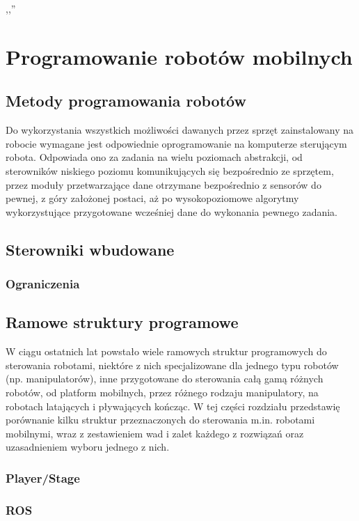 

\begin{savequote}[70mm]
,,''
\qauthor{}
\end{savequote}


\chapter{Programowanie robotów mobilnych}
\label{chap:programowanie}

\section{Metody programowania robotów}

Do wykorzystania wszystkich możliwości dawanych przez sprzęt zainstalowany na robocie
wymagane jest odpowiednie oprogramowanie na komputerze sterującym robota. Odpowiada
ono za zadania na wielu poziomach abstrakcji, od sterowników niskiego poziomu
komunikujących się bezpośrednio ze sprzętem, przez moduły przetwarzające dane otrzymane
bezpośrednio z sensorów do pewnej, z góry założonej postaci, aż po wysokopoziomowe
algorytmy wykorzystujące przygotowane wcześniej dane do wykonania pewnego zadania.

\section{Sterowniki wbudowane}

\subsection{Ograniczenia}

\section{Ramowe struktury programowe}


W ciągu ostatnich lat powstało wiele ramowych struktur programowych do sterowania
robotami, niektóre z nich specjalizowane dla jednego typu robotów (np. manipulatorów),
inne przygotowane do sterowania całą gamą różnych robotów, od platform mobilnych,
przez różnego rodzaju manipulatory, na robotach latających i pływających kończąc.
W tej części rozdziału przedstawię porównanie kilku struktur przeznaczonych do
sterowania m.in. robotami mobilnymi, wraz z zestawieniem wad i zalet każdego z rozwiązań
oraz uzasadnieniem wyboru jednego z nich.


\subsection{Player/Stage}

\cite{gerkey03playerstage}

\subsection{ROS}

\cite{288}
